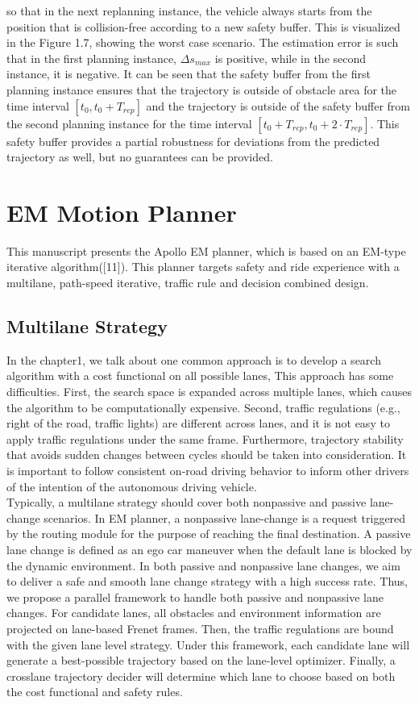 \documentclass{thesisreport}
\begin{document}
so that in the next replanning instance, the vehicle always starts from the position that is collision-free according to a
new safety buffer. This is visualized in the Figure 1.7, showing the worst case scenario. The estimation error is such that
in the first planning instance, $\Delta s_{max}$ is positive, while in the second instance, it is negative. It can be seen that the safety buffer from the first planning instance ensures that the trajectory is outside of obstacle area for the time interval $[t_0 , t_0 + T_{rep} ]$ and the trajectory is outside of the safety buffer from the second planning instance for the time interval
$[t_0 + T_{rep} , t_0 + 2·T_{rep} ]$. This safety buffer provides a partial
robustness for deviations from the predicted trajectory as well, but no guarantees can be provided.



 
 \chapter{EM Motion Planner}
 This manuscript presents the Apollo EM planner, which is based on an EM-type iterative algorithm([11]). This planner targets safety and ride experience with a multilane, path-speed iterative, traffic rule and decision combined design.
 \section{Multilane Strategy}
 In the chapter1, we talk about one common approach is to develop a search algorithm
 with a cost functional on all possible lanes, This approach has some difficulties. First, the search space is expanded across multiple lanes, which causes the algorithm to be computationally expensive. Second, traffic regulations (e.g., right of the road, traffic lights) are different across lanes, and it is not easy to apply traffic regulations under the same frame. Furthermore, trajectory stability that avoids sudden changes between cycles should be taken into consideration. It is important to follow consistent on-road driving behavior to inform other drivers of the intention of the autonomous driving vehicle.\\
 \indent
 Typically, a multilane strategy should cover both nonpassive and passive lane-change scenarios. In EM planner, a nonpassive lane-change is a request triggered by the routing module for the purpose of reaching the final destination. A passive lane change is defined as an ego car maneuver when the default lane is blocked by the dynamic environment. In both passive and nonpassive lane changes, we aim to deliver a safe and smooth lane change strategy with a high success rate.
 Thus, we propose a parallel framework to handle both passive and nonpassive lane changes. For candidate lanes, all obstacles and environment information are projected on lane-based Frenet frames. Then, the traffic regulations are bound with the given lane level strategy. Under this framework, each candidate lane will generate a best-possible trajectory based on the lane-level optimizer. Finally, a crosslane trajectory decider will determine which lane to choose based on both the cost functional and safety rules.
\end{document}
